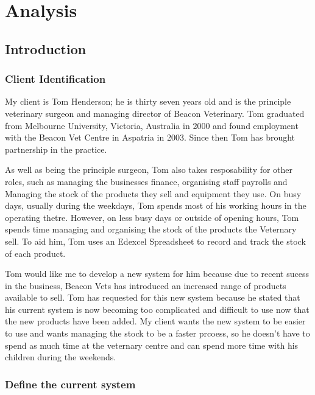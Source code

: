 \chapter{Analysis}

\section{Introduction}

\subsection{Client Identification}

\begin{flushleft}

My client is Tom Henderson; he is thirty seven years old and is the principle veterinary surgeon and managing director of Beacon Veterinary. Tom graduated from Melbourne University, Victoria, Australia in 2000 and found employment with the Beacon Vet Centre in Aspatria in 2003. Since then Tom has brought partnership in the practice. \par 

As well as being the  principle surgeon, Tom also takes resposability for other roles, such as managing the businesses finance, organising staff payrolls and Managing the stock of the products they sell and equipment they use. On busy days, usually during the weekdays, Tom spends most of his working hours in the operating thetre. However, on less busy days or outside of opening hours, Tom spends time managing and organising the stock of the products the Veternary sell. To aid him, Tom uses an Edexcel Spreadsheet to record and track the stock of each product. \par 

Tom would like me to develop a new system for him because due to recent sucess in the business, Beacon Vets has introduced an increased range of  products available to sell. Tom has requested for this new system because he stated that his current system is now becoming too complicated and difficult to use now that the new products have been added. My client wants the new system to be easier to use and wants managing the stock to be a faster prcoess, so he doesn't have to spend as much time at the veternary centre and can spend more time with his children during the weekends.\par
\end{flushleft}

\subsection{Define the current system}

